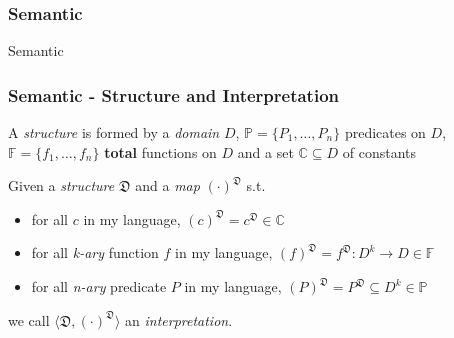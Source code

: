 \documentclass{beamer}
\begin{document}
            \subsubsection{Semantic}
                \begin{frame}
                    \begin{center}
                        \begin{Huge}
                            \textcolor{title_blue}{Semantic}
                        \end{Huge}
                    \end{center}
                \end{frame}

                \begin{frame}
                    \frametitle{Semantic - Structure and Interpretation}
                    \begin{definition}[Structure]
                        A \textit{structure} is formed by a \textit{domain} $ D $, $\mathbb{P} = \{ P_1, \dots, P_n \} $ predicates on $ D $, $ \mathbb{F} = \{ f_1, \dots, f_n \} $ \textbf{total} functions on $ D $ and a set $ \mathbb{C} \subseteq D $ of constants
                    \end{definition}
                    \begin{definition}[Interpretation]
                        Given a \textit{structure} $ \mathfrak{D} $ and a \textit{map} $ (\cdot)^{\mathfrak{D}} $ s.t.
                        \begin{itemize}
                            \item for all $ c $ in my language, $ (c)^\mathfrak{D} = c^\mathfrak{D} \in \mathbb{C} $
                            \item for all \textit{k-ary} function $ f $ in my language, $ (f)^\mathfrak{D} = f^\mathfrak{D}: D^k \to D \in \mathbb{F} $
                            \item for all \textit{n-ary} predicate $ P $ in my language, $ (P)^\mathfrak{D} = P^\mathfrak{D} \subseteq D^k \in \mathbb{P} $
                        \end{itemize}
                        we call $ \langle \mathfrak{D}, (\cdot)^{\mathfrak{D}} \rangle $ an \textit{interpretation}.
                    \end{definition}

                \end{frame}
\end{document}
